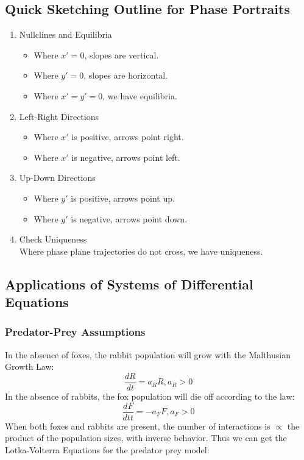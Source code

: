 \documentclass[12pt, landscape, twocolumn]{article}
\begin{document}
    \subsection{Quick Sketching Outline for Phase Portraits}
    \begin{enumerate}
    \item Nullclines and Equilibria
        \begin{itemize}
        \item Where $x\prime = 0$, slopes are vertical.
        \item Where $y\prime = 0$, slopes are horizontal.
        \item Where $x\prime = y\prime = 0$, we have equilibria.
        \end{itemize}
    \item Left-Right Directions
        \begin{itemize}
        \item Where $x\prime$ is positive, arrows point right.
        \item Where $x\prime$ is negative, arrows point left.
        \end{itemize}
    \item Up-Down Directions
        \begin{itemize}
        \item Where $y\prime$ is positive, arrows point up.
        \item Where $y\prime$ is negative, arrows point down.
        \end{itemize}
    \item Check Uniqueness\\
    Where phase plane trajectories do not cross, we have uniqueness.
    \end{enumerate}

    \subsection{Applications of Systems of Differential Equations}
        \subsubsection{Predator-Prey Assumptions}
        In the absence of foxes, the rabbit population will grow with the Malthusian Growth Law:
        \[
        \frac{dR}{dt} = a_R R, a_R > 0
        \]
        In the absence of rabbits, the fox population will die off according to the law:
        \[
        \frac{dF}{dtt} = -a_F F, a_F > 0
        \]
        When both foxes and rabbits are present, the number of interactions is $\propto$ the product of the population sizes, with inverse behavior. Thus we can get the Lotka-Volterra Equations for the predator prey model:
\end{document}
